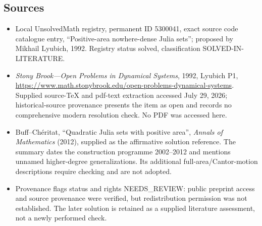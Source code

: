 \documentclass[11pt]{article}
\begin{document}
\subsection{Sources}
\begin{itemize}
\item Local UnsolvedMath registry, permanent ID 5300041, exact source code catalogue entry, ``Positive-area nowhere-dense Julia sets''; proposed by Mikhail Lyubich, 1992. Registry status solved, classification SOLVED-IN-LITERATURE.
\item \emph{Stony Brook---Open Problems in Dynamical Systems}, 1992, Lyubich P1, \url{https://www.math.stonybrook.edu/open-problems-dynamical-systems}. Supplied source-TeX and pdf-text extraction accessed July 29, 2026; historical-source provenance presents the item as open and records no comprehensive modern resolution check. No PDF was accessed here.
\item Buff--Ch\'eritat, ``Quadratic Julia sets with positive area'', \emph{Annals of Mathematics} (2012), supplied as the affirmative solution reference. The summary dates the construction programme 2002--2012 and mentions unnamed higher-degree generalizations. Its additional full-area/Cantor-motion descriptions require checking and are not adopted.
\item Provenance flags status and rights NEEDS\_REVIEW: public preprint access and source provenance were verified, but redistribution permission was not established. The later solution is retained as a supplied literature assessment, not a newly performed check.
\end{itemize}
\end{document}
